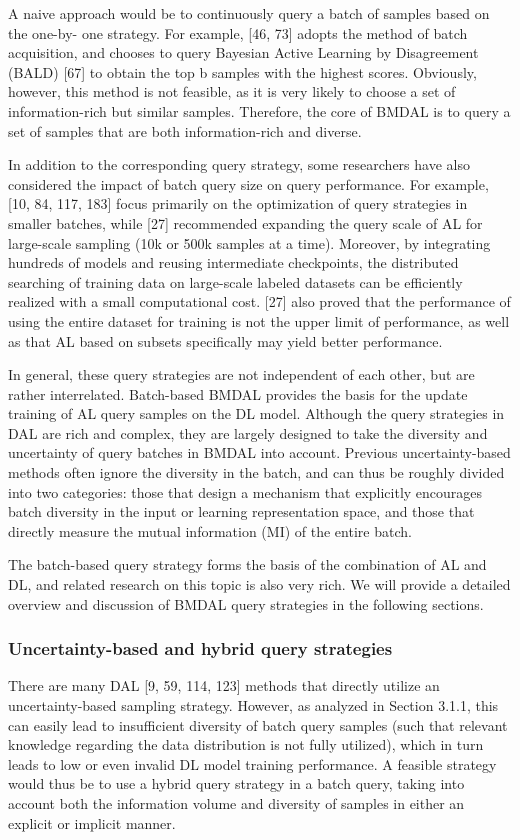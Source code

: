 A naive approach would be to continuously query a batch of samples based on the one-by-
one strategy. For example, [46, 73] adopts the method of batch acquisition, and chooses to query
Bayesian Active Learning by Disagreement (BALD) [67] to obtain the top b samples with the
highest scores. Obviously, however, this method is not feasible, as it is very likely to choose a set
of information-rich but similar samples. Therefore, the core of BMDAL is to query a set of samples that are both information-rich and diverse.

In addition to the corresponding query strategy, some researchers have also considered the
impact of batch query size on query performance. For example, [10, 84, 117, 183] focus primarily
on the optimization of query strategies in smaller batches, while [27] recommended expanding the
query scale of AL for large-scale sampling (10k or 500k samples at a time). Moreover, by integrating
hundreds of models and reusing intermediate checkpoints, the distributed searching of training
data on large-scale labeled datasets can be efficiently realized with a small computational cost. [27]
also proved that the performance of using the entire dataset for training is not the upper limit of
performance, as well as that AL based on subsets specifically may yield better performance.


In general, these query strategies are not independent of each other, but are rather interrelated.
Batch-based BMDAL provides the basis for the update training of AL query samples on the DL
model. Although the query strategies in DAL are rich and complex, they are largely designed to take
the diversity and uncertainty of query batches in BMDAL into account. Previous uncertainty-based
methods often ignore the diversity in the batch, and can thus be roughly divided into two categories:
those that design a mechanism that explicitly encourages batch diversity in the input or learning
representation space, and those that directly measure the mutual information (MI) of the entire
batch.

The batch-based query strategy forms the basis of the combination of AL and DL, and related
research on this topic is also very rich. We will provide a detailed overview and discussion of
BMDAL query strategies in the following sections.

\subsubsection{Uncertainty-based and hybrid query strategies}
There are many DAL [9, 59, 114, 123] methods that directly utilize an uncertainty-based sampling
strategy. However, as analyzed in Section 3.1.1, this can easily lead to insufficient diversity of
batch query samples (such that relevant knowledge regarding the data distribution is not fully
utilized), which in turn leads to low or even invalid DL model training performance. A feasible
strategy would thus be to use a hybrid query strategy in a batch query, taking into account both
the information volume and diversity of samples in either an explicit or implicit manner.

